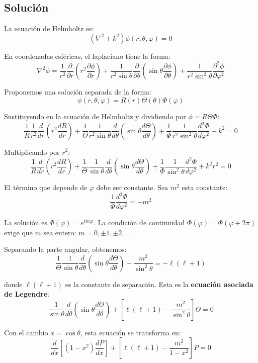 \documentclass[a4paper]{article}
\begin{document}
\subsection{Solución}
La ecuación de Helmholtz es:
$$(\nabla^2 + k^2)\phi(r, \theta, \varphi) = 0$$

En coordenadas esféricas, el laplaciano tiene la forma:
$$\nabla^2\phi = \frac{1}{r^2}\frac{\partial}{\partial r}\left(r^2\frac{\partial\phi}{\partial r}\right) + \frac{1}{r^2\sin\theta}\frac{\partial}{\partial\theta}\left(\sin\theta\frac{\partial\phi}{\partial\theta}\right) + \frac{1}{r^2\sin^2\theta}\frac{\partial^2\phi}{\partial\varphi^2}$$

Proponemos una solución separada de la forma:
$$\phi(r, \theta, \varphi) = R(r)\Theta(\theta)\Phi(\varphi)$$

Sustituyendo en la ecuación de Helmholtz y dividiendo por $\phi = R\Theta\Phi$:
$$\frac{1}{R}\frac{1}{r^2}\frac{d}{dr}\left(r^2\frac{dR}{dr}\right) + \frac{1}{\Theta}\frac{1}{r^2\sin\theta}\frac{d}{d\theta}\left(\sin\theta\frac{d\Theta}{d\theta}\right) + \frac{1}{\Phi}\frac{1}{r^2\sin^2\theta}\frac{d^2\Phi}{d\varphi^2} + k^2 = 0$$

Multiplicando por $r^2$:
$$\frac{1}{R}\frac{d}{dr}\left(r^2\frac{dR}{dr}\right) + \frac{1}{\Theta}\frac{1}{\sin\theta}\frac{d}{d\theta}\left(\sin\theta\frac{d\Theta}{d\theta}\right) + \frac{1}{\Phi}\frac{1}{\sin^2\theta}\frac{d^2\Phi}{d\varphi^2} + k^2r^2 = 0$$

El término que depende de $\varphi$ debe ser constante. Sea $m^2$ esta constante:
$$\frac{1}{\Phi}\frac{d^2\Phi}{d\varphi^2} = -m^2$$

La solución es $\Phi(\varphi) = e^{im\varphi}$. La condición de continuidad $\Phi(\varphi) = \Phi(\varphi + 2\pi)$ exige que $m$ sea entero: $m = 0, \pm 1, \pm 2, \ldots$

Separando la parte angular, obtenemos:
$$\frac{1}{\Theta}\frac{1}{\sin\theta}\frac{d}{d\theta}\left(\sin\theta\frac{d\Theta}{d\theta}\right) - \frac{m^2}{\sin^2\theta} = -\ell(\ell+1)$$

donde $\ell(\ell+1)$ es la constante de separación. Esta es la \textbf{ecuación asociada de Legendre}:
$$\frac{1}{\sin\theta}\frac{d}{d\theta}\left(\sin\theta\frac{d\Theta}{d\theta}\right) + \left[\ell(\ell+1) - \frac{m^2}{\sin^2\theta}\right]\Theta = 0$$

Con el cambio $x = \cos\theta$, esta ecuación se transforma en:
$$\frac{d}{dx}\left[(1-x^2)\frac{dP}{dx}\right] + \left[\ell(\ell+1) - \frac{m^2}{1-x^2}\right]P = 0$$
\end{document}
